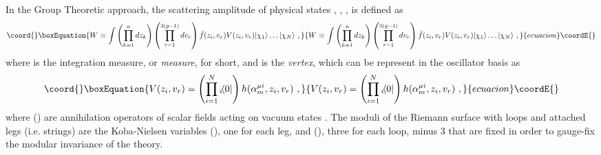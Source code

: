 \documentclass[a4paper,12pt]{article}
\begin{document}
In the Group Theoretic approach, the scattering amplitude \coordHE{} of \coordHE{} physical states \myHighlight{$|\chi
_1\rangle $}\coordHE{}, \myHighlight{$|\chi _2\rangle $}\coordHE{}, \myHighlight{$\dots $}\coordHE{}, \coordHE{} is defined as
\begin{equation}\coord{}\boxEquation{
W\equiv \int \left( \prod_{k=1}^ndz_k\right) \left( \prod_{r=1}^{3(g-1)}dv_r\right) \bar
f(z_i,v_r)V(z_i,v_r)|\chi _1\rangle \dots |\chi _N\rangle \ ,
}{
W\equiv \int \left( \prod_{k=1}^ndz_k\right) \left( \prod_{r=1}^{3(g-1)}dv_r\right) \bar
f(z_i,v_r)V(z_i,v_r)|\chi _1\rangle \dots |\chi _N\rangle \ ,
}{ecuacion}\coordE{}\end{equation}
where \coordHE{} is the integration measure, or {\sl measure}, for short, and
\coordHE{} is the {\sl vertex}, which can be represent in the oscillator basis as
\begin{equation}\coord{}\boxEquation{
V(z_i,v_r)=\left( \prod_{i=1}^N{ }_i\! \langle 0|\right) h(\alpha ^{\mu i}_m,z_i,v_r)\ ,
}{
V(z_i,v_r)=\left( \prod_{i=1}^N{ }_i\! \langle 0|\right) h(\alpha ^{\mu i}_m,z_i,v_r)\ ,
}{ecuacion}\coordE{}\end{equation}
where \coordHE{} (\coordHE{}) are annihilation operators of scalar fields acting on \coordHE{}
vacuum states \coordHE{}. The moduli of the Riemann surface with \coordHE{} loops and \coordHE{}
attached legs (i.e. strings) are the Koba-Nielsen variables \coordHE{} (\coordHE{}), one for
each leg, and \coordHE{} (\coordHE{}), three for each loop, minus 3 that are fixed in
order to gauge-fix the modular invariance of the theory.
\end{document}
